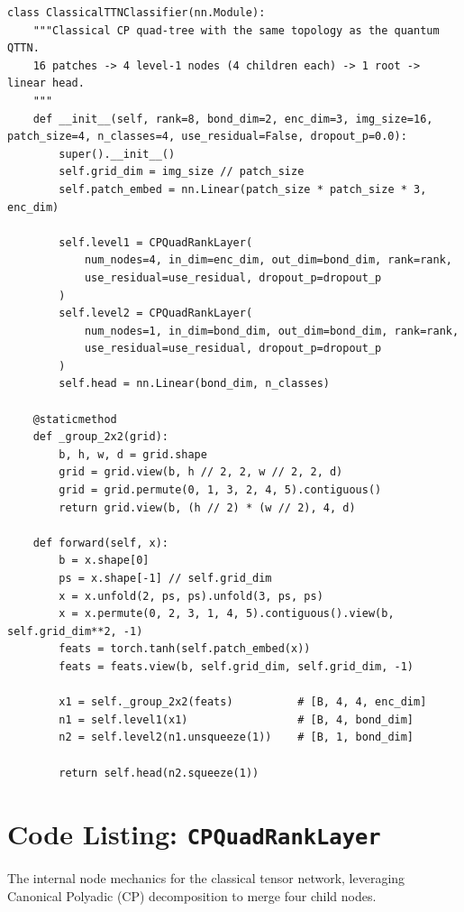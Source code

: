 \documentclass[12pt, a4paper, oneside]{report}
\begin{document}
\begin{verbatim}
class ClassicalTTNClassifier(nn.Module):
    """Classical CP quad-tree with the same topology as the quantum QTTN.
    16 patches -> 4 level-1 nodes (4 children each) -> 1 root -> linear head.
    """
    def __init__(self, rank=8, bond_dim=2, enc_dim=3, img_size=16, patch_size=4, n_classes=4, use_residual=False, dropout_p=0.0):
        super().__init__()
        self.grid_dim = img_size // patch_size
        self.patch_embed = nn.Linear(patch_size * patch_size * 3, enc_dim)
        
        self.level1 = CPQuadRankLayer(
            num_nodes=4, in_dim=enc_dim, out_dim=bond_dim, rank=rank, 
            use_residual=use_residual, dropout_p=dropout_p
        )
        self.level2 = CPQuadRankLayer(
            num_nodes=1, in_dim=bond_dim, out_dim=bond_dim, rank=rank, 
            use_residual=use_residual, dropout_p=dropout_p
        )
        self.head = nn.Linear(bond_dim, n_classes)

    @staticmethod
    def _group_2x2(grid):
        b, h, w, d = grid.shape
        grid = grid.view(b, h // 2, 2, w // 2, 2, d)
        grid = grid.permute(0, 1, 3, 2, 4, 5).contiguous()
        return grid.view(b, (h // 2) * (w // 2), 4, d)

    def forward(self, x):
        b = x.shape[0]
        ps = x.shape[-1] // self.grid_dim
        x = x.unfold(2, ps, ps).unfold(3, ps, ps)
        x = x.permute(0, 2, 3, 1, 4, 5).contiguous().view(b, self.grid_dim**2, -1)
        feats = torch.tanh(self.patch_embed(x))
        feats = feats.view(b, self.grid_dim, self.grid_dim, -1)
        
        x1 = self._group_2x2(feats)          # [B, 4, 4, enc_dim]
        n1 = self.level1(x1)                 # [B, 4, bond_dim]
        n2 = self.level2(n1.unsqueeze(1))    # [B, 1, bond_dim]
        
        return self.head(n2.squeeze(1))
\end{verbatim}

\section*{Code Listing: \texttt{CPQuadRankLayer}}
The internal node mechanics for the classical tensor network, leveraging Canonical Polyadic (CP) decomposition to merge four child nodes.
\end{document}

